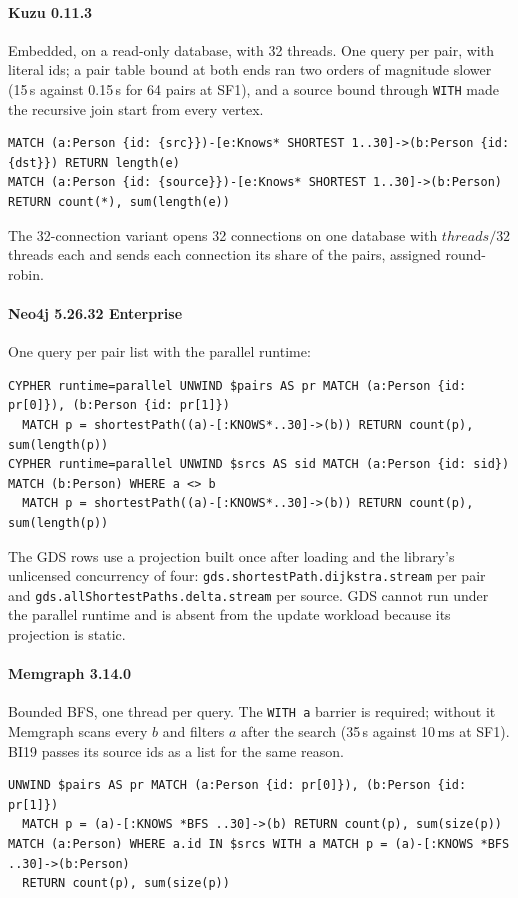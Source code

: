 \paragraph{Kuzu 0.11.3} Embedded, on a read-only database, with 32 threads. One query per pair, with literal ids; a
pair table bound at both ends ran two orders of magnitude slower (15\,s against 0.15\,s for 64 pairs at SF1), and a
source bound through \texttt{WITH} made the recursive join start from every vertex.
\begin{lstlisting}
MATCH (a:Person {id: {src}})-[e:Knows* SHORTEST 1..30]->(b:Person {id: {dst}}) RETURN length(e)
MATCH (a:Person {id: {source}})-[e:Knows* SHORTEST 1..30]->(b:Person) RETURN count(*), sum(length(e))
\end{lstlisting}
The 32-connection variant opens 32 connections on one database with $\mathit{threads}/32$ threads each and sends each
connection its share of the pairs, assigned round-robin.

\paragraph{Neo4j 5.26.32 Enterprise} One query per pair list with the parallel runtime:
\begin{lstlisting}
CYPHER runtime=parallel UNWIND $pairs AS pr MATCH (a:Person {id: pr[0]}), (b:Person {id: pr[1]})
  MATCH p = shortestPath((a)-[:KNOWS*..30]->(b)) RETURN count(p), sum(length(p))
CYPHER runtime=parallel UNWIND $srcs AS sid MATCH (a:Person {id: sid}) MATCH (b:Person) WHERE a <> b
  MATCH p = shortestPath((a)-[:KNOWS*..30]->(b)) RETURN count(p), sum(length(p))
\end{lstlisting}
The GDS rows use a projection built once after loading and the library's unlicensed concurrency of four:
\texttt{gds.shortestPath.dijkstra.stream} per pair and \texttt{gds.allShortestPaths.delta.stream} per source. GDS
cannot run under the parallel runtime and is absent from the update workload because its projection is static.

\paragraph{Memgraph 3.14.0} Bounded BFS, one thread per query. The \texttt{WITH a} barrier is required; without it
Memgraph scans every $b$ and filters $a$ after the search (35\,s against 10\,ms at SF1). BI19 passes its source ids as
a list for the same reason.
\begin{lstlisting}
UNWIND $pairs AS pr MATCH (a:Person {id: pr[0]}), (b:Person {id: pr[1]})
  MATCH p = (a)-[:KNOWS *BFS ..30]->(b) RETURN count(p), sum(size(p))
MATCH (a:Person) WHERE a.id IN $srcs WITH a MATCH p = (a)-[:KNOWS *BFS ..30]->(b:Person)
  RETURN count(p), sum(size(p))
\end{lstlisting}

